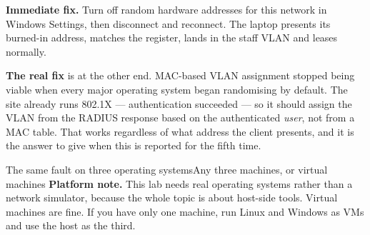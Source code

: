 \begin{breakfix}
\textbf{Immediate fix.} Turn off random hardware addresses for this network in
Windows Settings, then disconnect and reconnect. The laptop presents its burned-in
address, matches the register, lands in the staff VLAN and leases normally.

\textbf{The real fix} is at the other end. MAC-based VLAN assignment stopped being
viable when every major operating system began randomising by default. The site
already runs 802.1X --- authentication succeeded --- so it should assign the VLAN
from the RADIUS response based on the authenticated \emph{user}, not from a MAC
table. That works regardless of what address the client presents, and it is the
answer to give when this is reported for the fifth time.
\end{breakfix}

\begin{lab}{The same fault on three operating systems}{Any three machines, or virtual machines}
\textbf{Platform note.} This lab needs real operating systems rather than a
network simulator, because the whole topic is about host-side tools. Virtual
machines are fine. If you have only one machine, run Linux and Windows as VMs and
use the host as the third.


\end{lab}
